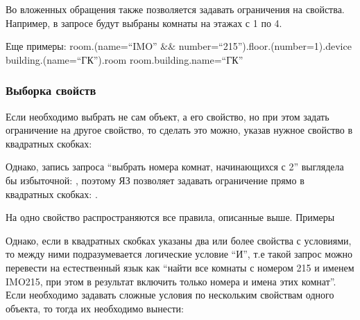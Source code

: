 Во вложенных обращения также позволяется задавать ограничения на свойства. Например,
в запросе
будут выбраны комнаты на этажах с 1 по 4.

Еще примеры:
    {room.(name=``IMO'' $\&\&$ number=``215'').floor.(number=1).device}
    {building.(name=``ГК'').room}
    {room.building.name=``ГК''}



\subsubsection{Выборка свойств}
Если необходимо выбрать не сам объект, а его свойство, но при этом задать ограничение на другое
свойство, то сделать это можно, указав нужное свойство в квадратных скобках:

Однако, запись запроса ``выбрать номера комнат, начинающихся с 2'' выглядела бы
избыточной:
,
поэтому ЯЗ позволяет задавать ограничение прямо в квадратных скобках:
.

На одно свойство распространяются все правила, описанные выше. Примеры


Однако, если в квадратных скобках указаны два или более свойства с условиями, то между 
ними подразумевается логические условие ``И'', т.е такой запрос
можно перевести на естественный язык как ``найти все комнаты с номером 215 и именем IMO215, 
при этом в результат включить только номера и имена этих комнат''.
Если необходимо задавать сложные условия по нескольким свойствам одного объекта, то тогда их необходимо вынести:







